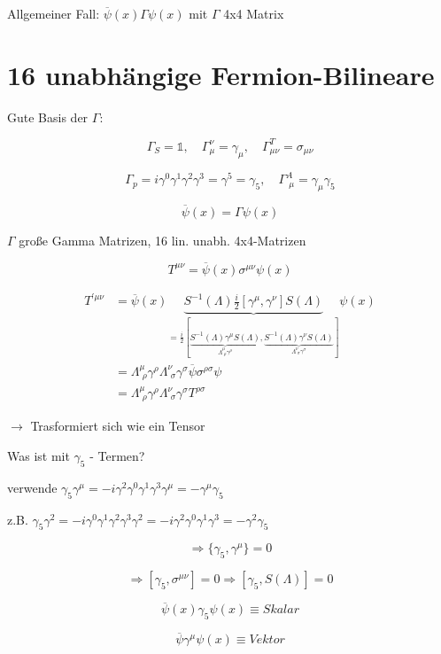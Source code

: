 Allgemeiner Fall: \( \overline \psi(x)\Gamma \psi(x)  \) mit \(\Gamma\) 4x4 Matrix

\section{16 unabhängige Fermion-Bilineare}

Gute Basis der \(\Gamma\):

\[\Gamma_S = \mathbb 1, \quad \Gamma^\nu_\mu =\gamma_\mu, \quad \Gamma^T_{\mu\nu} = \sigma_{\mu\nu}\]

\[\Gamma_p = i\gamma^0\gamma^1\gamma^2\gamma^3 = \gamma^5 = \gamma_5, \quad \Gamma^A_{\,\,\mu} = \gamma_\mu\gamma_5 \]




\[\overline \psi(x) = \Gamma\psi(x)\]

\(\Gamma\) große Gamma Matrizen, 16 lin. unabh. 4x4-Matrizen

\[T^{\mu\nu}=\overline \psi(x)\sigma^{\mu\nu} \psi(x) \]

\begin{align}
T^{'\mu\nu}&=\overline \psi(x)\underbrace{  S^{-1}(\Lambda)\frac{i}{2}[\gamma^\mu,\gamma^\nu]S(\Lambda)}_{  = \frac{i}{2}[\underbrace{S^{-1}(\Lambda)\gamma^\mu S(\Lambda)}_{\Lambda^\mu_{\,\,\rho}\gamma^\rho},\underbrace{S^{-1}(\Lambda)\gamma^\nu S(\Lambda)}_{\Lambda^\nu_{\,\,\sigma}\gamma^\sigma} ]  } \psi(x)\\
&= \Lambda^\mu_{\,\,\rho}\gamma^\rho \Lambda^\nu_{\,\,\sigma}\gamma^\sigma\overline \psi \sigma^{\rho\sigma}\psi\\
&= \Lambda^\mu_{\,\,\rho}\gamma^\rho \Lambda^\nu_{\,\,\sigma}\gamma^\sigma T^{\rho\sigma}
\end{align}

\(\rightarrow \) Trasformiert sich wie ein Tensor

Was ist mit \(\gamma_5\) - Termen?

verwende \(\gamma_5\gamma^\mu =- i\gamma^2\gamma^0\gamma^1\gamma^3\gamma^\mu = -\gamma^\mu\gamma_5 \)

z.B. \(\gamma_5\gamma^2 = - i\gamma^0\gamma^1\gamma^2\gamma^3\gamma^2 = - i\gamma^2\gamma^0\gamma^1\gamma^3 = -\gamma^2\gamma_5 \)

\[\Rightarrow \{ \gamma_5,\gamma^\mu \} = 0\]

\[\Rightarrow [\gamma_5,\sigma^{\mu\nu}]=0 \Rightarrow [\gamma_5,S(\Lambda)]=0\]

\[\overline\psi(x)\gamma_5\psi(x) \equiv Skalar\]


\[\overline \psi \gamma^\mu\psi(x) \equiv Vektor \]

